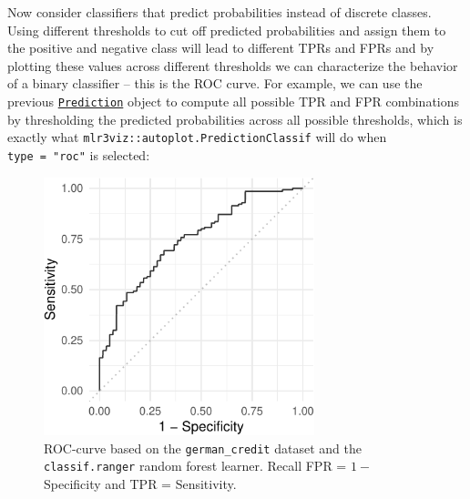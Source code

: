 Now consider classifiers that predict probabilities instead of discrete
classes. Using different thresholds to cut off predicted probabilities
and assign them to the positive and negative class will lead to
different TPRs and FPRs and by plotting these values across different
thresholds we can characterize the behavior of a binary classifier --
this is the ROC curve. For example, we can use the previous
\href{https://mlr3.mlr-org.com/reference/Prediction.html}{\texttt{Prediction}}
object to compute all possible TPR and FPR combinations by thresholding
the predicted probabilities across all possible thresholds, which is
exactly what \texttt{mlr3viz::autoplot.PredictionClassif} will do when
\texttt{type\ =\ "roc"} is selected:

\begin{Shaded}
\begin{Highlighting}[]
 \NormalTok{)}
\end{Highlighting}
\end{Shaded}

\begin{figure}

{\centering \includegraphics[width=0.7\textwidth,height=\textheight]{chapters/chapter3/evaluation_and_benchmarking_files/figure-pdf/fig-basics-roc-ranger-1.pdf}

}

\caption{\label{fig-basics-roc-ranger}ROC-curve based on the
\texttt{german\_credit} dataset and the \texttt{classif.ranger} random
forest learner. Recall FPR = \(1 -\) Specificity and TPR = Sensitivity.}

\end{figure}

